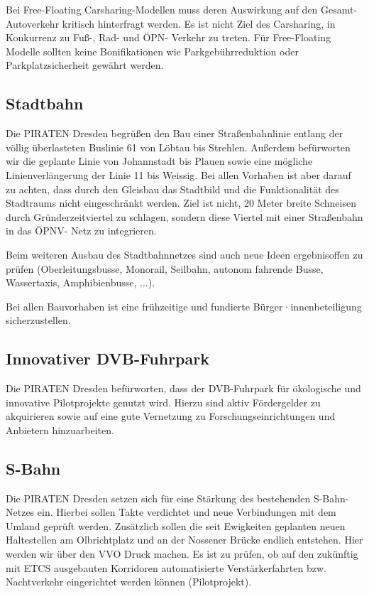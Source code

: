 \documentclass[a4paper, 11pt]{article}
\begin{document}
Bei Free-Floating Carsharing-Modellen muss deren Auswirkung auf den Gesamt-Autoverkehr kritisch hinterfragt werden. Es ist nicht Ziel des Carsharing, in Konkurrenz zu Fuß-, Rad- und ÖPN- Verkehr zu treten. Für Free-Floating Modelle sollten keine Bonifikationen wie Parkgebührreduktion oder Parkplatzsicherheit gewährt werden.



\subsection{Stadtbahn}
Die PIRATEN Dresden begrüßen den Bau einer Straßenbahnlinie entlang der völlig überlasteten Buslinie 61 von Löbtau bis Strehlen. Außerdem befürworten wir die geplante Linie von Johannstadt bis Plauen sowie eine mögliche Linienverlängerung der Linie 11 bis Weissig. Bei allen Vorhaben ist aber darauf zu achten, dass durch den Gleisbau das Stadtbild und die Funktionalität des Stadtraums nicht eingeschränkt werden. Ziel ist nicht, 20 Meter breite Schneisen durch Gründerzeitviertel zu schlagen, sondern diese Viertel mit einer Straßenbahn in das ÖPNV- Netz zu integrieren.\newline

Beim weiteren Ausbau des Stadtbahnnetzes sind auch neue Ideen ergebnisoffen zu prüfen (Oberleitungsbusse, Monorail, Seilbahn, autonom fahrende Busse, Wassertaxis, Amphibienbusse, ...).\newline

Bei allen Bauvorhaben ist eine frühzeitige und fundierte Bürger·innenbeteiligung sicherzustellen.


\subsection{Innovativer DVB-Fuhrpark}
Die PIRATEN Dresden befürworten, dass der DVB-Fuhrpark für ökologische und innovative Pilotprojekte genutzt wird. Hierzu sind aktiv Fördergelder zu akquirieren sowie auf eine gute Vernetzung zu Forschungseinrichtungen und Anbietern hinzuarbeiten.


\subsection{S-Bahn}
Die PIRATEN Dresden setzen sich für eine Stärkung des bestehenden S-Bahn-Netzes ein. Hierbei sollen Takte verdichtet und neue Verbindungen mit dem Umland geprüft werden. Zusätzlich sollen die seit Ewigkeiten geplanten neuen Haltestellen am Olbrichtplatz und an der Nossener Brücke endlich entstehen. Hier werden wir über den VVO Druck machen. Es ist zu prüfen, ob auf den zukünftig mit ETCS ausgebauten Korridoren automatisierte Verstärkerfahrten bzw. Nachtverkehr eingerichtet werden können (Pilotprojekt).
\end{document}
